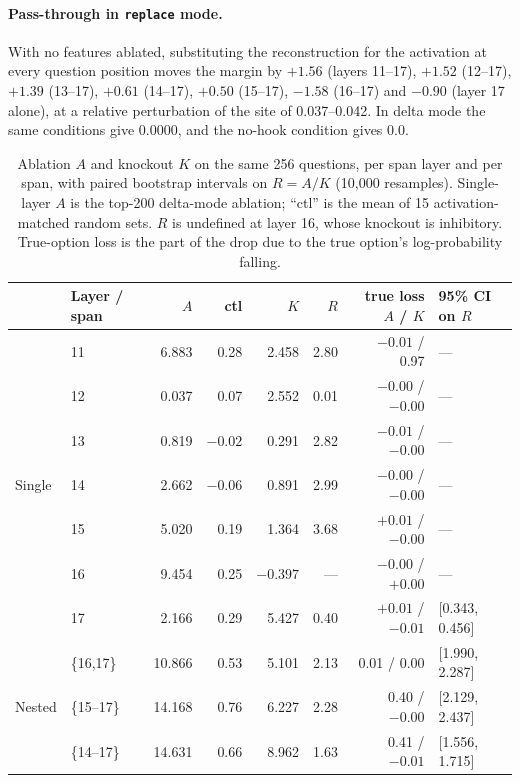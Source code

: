 \documentclass[11pt,a4paper]{article}
\begin{document}
\paragraph{Pass-through in \texttt{replace} mode.} With no features ablated,
substituting the reconstruction for the activation at every question position
moves the margin by $+1.56$ (layers 11--17), $+1.52$ (12--17), $+1.39$
(13--17), $+0.61$ (14--17), $+0.50$ (15--17), $-1.58$ (16--17) and $-0.90$
(layer 17 alone), at a relative perturbation of the site of 0.037--0.042. In
delta mode the same conditions give $0.0000$, and the no-hook condition gives
$0.0$.

\begin{table}[h]
  \centering
  \caption{Ablation $A$ and knockout $K$ on the same 256 questions, per span
  layer and per span, with paired bootstrap intervals on $R = A/K$ (10{,}000
  resamples). Single-layer $A$ is the top-200 delta-mode ablation; ``ctl'' is
  the mean of 15 activation-matched random sets. $R$ is undefined at layer 16,
  whose knockout is inhibitory. True-option loss is the part of the drop due
  to the true option's log-probability falling.}
  \label{tab:gemma-spans}
  \small
  \begin{tabular}{llrrrrrl}
    \toprule
    & Layer / span & $A$ & ctl & $K$ & $R$ & true loss $A$ / $K$ & 95\% CI on $R$ \\
    \midrule
    \multirow{7}{*}{Single}
      & 11 & 6.883 & 0.28 &  2.458 & 2.80 & $-0.01$ / 0.97 & --- \\
      & 12 & 0.037 & 0.07 &  2.552 & 0.01 & $-0.00$ / $-0.00$ & --- \\
      & 13 & 0.819 & $-0.02$ & 0.291 & 2.82 & $-0.01$ / $-0.00$ & --- \\
      & 14 & 2.662 & $-0.06$ & 0.891 & 2.99 & $-0.00$ / $-0.00$ & --- \\
      & 15 & 5.020 & 0.19 &  1.364 & 3.68 & $+0.01$ / $-0.00$ & --- \\
      & 16 & 9.454 & 0.25 & $-0.397$ & --- & $-0.00$ / $+0.00$ & --- \\
      & 17 & 2.166 & 0.29 &  5.427 & 0.40 & $+0.01$ / $-0.01$ & [0.343, 0.456] \\
    \midrule
    \multirow{6}{*}{Nested}
      & \{16,17\}  & 10.866 & 0.53 &  5.101 & 2.13 & 0.01 / 0.00 & [1.990, 2.287] \\
      & \{15--17\} & 14.168 & 0.76 &  6.227 & 2.28 & 0.40 / $-0.00$ & [2.129, 2.437] \\
      & \{14--17\} & 14.631 & 0.66 &  8.962 & 1.63 & 0.41 / $-0.01$ & [1.556, 1.715] \\

\end{tabular}
\end{table}
\end{document}
